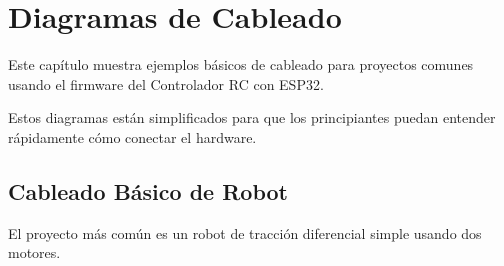 \chapter{Diagramas de Cableado}

Este capítulo muestra ejemplos básicos de cableado para proyectos comunes usando el firmware del Controlador RC con ESP32.

Estos diagramas están simplificados para que los principiantes puedan entender rápidamente cómo conectar el hardware.

\section{Cableado Básico de Robot}

El proyecto más común es un robot de tracción diferencial simple usando dos motores.


